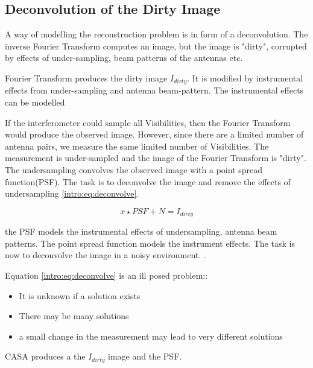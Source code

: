 

\subsection{Deconvolution of the Dirty Image}
A way of modelling the reconstruction problem is in form of a deconvolution. The inverse Fourier Transform computes an image, but the image is "dirty", corrupted by effects of under-sampling, beam patterns of the antennas etc.

Fourier Transform produces the dirty image $I_{dirty}$. It is modified by instrumental effects from under-sampling and antenna beam-pattern. The instrumental effects can be modelled

If the interferometer could sample all Visibilities, then the Fourier Transform would produce the observed image. However, since there are a limited number of antenna pairs, we  measure the same limited number of Visibilities. The measurement is under-sampled and the image of the Fourier Transform is "dirty". The undersampling convolves the observed image with a point spread function(PSF). The task is to deconvolve the image and remove the effects of undersampling \eqref{intro:eq:deconvolve}.

\begin{equation}\label{intro:eq:deconvolve}
x \star  PSF + N = I_{dirty} 
\end{equation}

the PSF models the instrumental effects of undersampling, antenna beam patterns.
The point spread function models the instrument effects. The task is now to deconvolve the image in a noisy environment.  .

Equation \eqref{intro:eq:deconvolve} is an ill posed problem::
\begin{itemize}
	\item It is unknown if a solution exists
	\item There may be many solutions
	\item a small change in the measurement may lead to very different solutions 
\end{itemize}



CASA produces a the $I_{dirty}$ image and the PSF.


